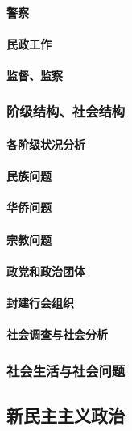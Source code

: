 \documentclass[UTF8]{../RepresentationUniverse}
\begin{document}
        \paragraph{警察}
        \paragraph{民政工作}
        \paragraph{监督、监察}

    \subsubsection{阶级结构、社会结构}
        \paragraph{各阶级状况分析}
        \paragraph{民族问题}
        \paragraph{华侨问题}
        \paragraph{宗教问题}
        \paragraph{政党和政治团体}
        \paragraph{封建行会组织}
        \paragraph{社会调查与社会分析}
    \subsubsection{社会生活与社会问题}


\subsection{新民主主义政治}
\end{document}
